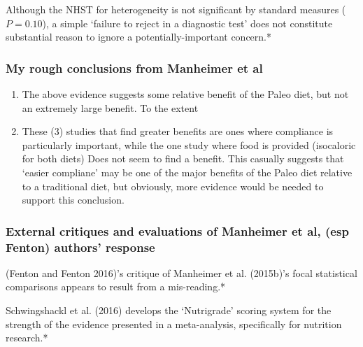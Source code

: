 \documentclass[]{tufte-handout}
\begin{document}
Although the NHST for heterogeneity is not significant by standard
measures (\(P=0.10\)), a simple `failure to reject in a diagnostic test'
does not constitute substantial reason to ignore a potentially-important
concern.*

\hypertarget{my-rough-conclusions-from-manheimer-et-al}{%
\subsubsection{My rough conclusions from Manheimer et
al}\label{my-rough-conclusions-from-manheimer-et-al}}

\begin{enumerate}
\def\labelenumi{\arabic{enumi}.}
\item
  The above evidence suggests some relative benefit of the Paleo diet,
  but not an extremely large benefit. To the extent
\item
  These (3) studies that find greater benefits are ones where compliance
  is particularly important, while the one study where food is provided
  (isocaloric for both diets) Does not seem to find a benefit. This
  casually suggests that `easier compliane' may be one of the major
  benefits of the Paleo diet relative to a traditional diet, but
  obviously, more evidence would be needed to support this conclusion.
\end{enumerate}

\hypertarget{critiques}{%
\subsubsection{External critiques and evaluations of Manheimer et al,
(esp Fenton) authors' response}\label{critiques}}

(Fenton and Fenton 2016)'s critique of Manheimer et al. (2015b)'s focal
statistical comparisons appears to result from a mis-reading.*


Schwingshackl et al. (2016) develops the `Nutrigrade' scoring system for
the strength of the evidence presented in a meta-analysis, specifically
for nutrition research.*
\end{document}
